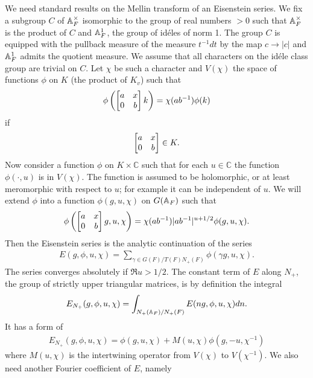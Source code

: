 \subsection{}
We need standard results on the Mellin transform of an Eisenstein series.
We fix a subgroup $C$ of $\mathbb{A}_F^\times$ isomorphic to the group of real numbers $>0$ such that $\mathbb{A}_F^\times$ is the product of $C$ and $\mathbb{A}_F^{1}$,
the group of id\'eles of norm 1.
The group $C$ is equipped with the pullback measure of the measure $t^{-1} dt$ by the map $c \to |c|$ and $\mathbb{A}_F^1$ admits the quotient measure.
We assume that all characters on the id\'ele class group are trivial on $C$.
Let $\chi$ be such a character and $V(\chi)$ the space of functions $\phi$ on $K$ (the product of $K_v$) such that
\begin{align}
    \phi\left(\begin{bmatrix} a & x \\ 0 & b \end{bmatrix}k\right) = \chi(ab^{-1})\phi(k)
\end{align}
if 
\begin{align*}
    \begin{bmatrix} a & x \\ 0 & b \end{bmatrix} \in K.
\end{align*}
Now consider a function $\phi$ on $K\times \mathbb{C}$ such that for each $u \in\mathbb{C}$ the function $\phi(\cdot, u)$ is in $V(\chi)$.
The function is assumed to be holomorphic, or at least meromorphic with respect to $u$; for example it can be independent of $u$.
We will extend $\phi$ into a function $\phi(g, u, \chi)$ on $G(\mathbb{A}_F)$ such that
\begin{align}
    \phi\left(\begin{bmatrix} a & x \\ 0 & b \end{bmatrix}g, u, \chi\right) = \chi(ab^{-1}) |ab^{-1}|^{u+ 1/2}\phi(g, u, \chi).
\end{align}
Then the Eisenstein series is the analytic continuation of the series
\begin{align}
    E(g, \phi, u, \chi) = \sum_{\gamma \in G(F) / T(F) N_+(F)} \phi(\gamma g, u, \chi).
\end{align}
The series converges absolutely if $\Re u > 1/2$.
The constant term of $E$ along $N_{+}$, the group of strictly upper triangular matrices, is by definition the integral
\begin{align}
    E_{N_{+}}(g, \phi, u, \chi) = \int_{N_+(\mathbb{A}_F) / N_+(F)} E(ng, \phi, u, \chi) dn.
\end{align}
It has a form of 
\begin{align}
    E_{N_{+}}(g, \phi, u, \chi) = \phi(g, u, \chi) + M(u, \chi)\phi(g, -u, \chi^{-1})
\end{align}
where $M(u, \chi)$ is the intertwining operator from $V(\chi)$ to $V(\chi^{-1})$.
We also need another Fourier coefficient of $E$, namely
